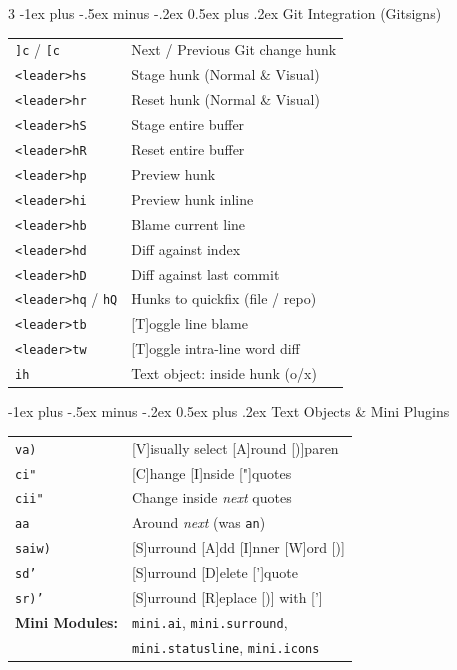 \documentclass[11pt,landscape]{article}
\makeatletter
\renewcommand{\section}{\@startsection{section}{1}{0mm}%
                                {-1ex plus -.5ex minus -.2ex}%
                                {0.5ex plus .2ex}%
                                {\normalfont\large\bfseries\color{myblue}}}
\makeatother
\begin{document}
\begin{multicols}{3}
\section{Git Integration (Gitsigns)}
\begin{tabular}{@{}ll@{}}
\texttt{]c} / \texttt{[c} & Next / Previous Git change hunk \\
\texttt{<leader>hs} & Stage hunk (Normal \& Visual) \\
\texttt{<leader>hr} & Reset hunk (Normal \& Visual) \\
\texttt{<leader>hS} & Stage entire buffer \\
\texttt{<leader>hR} & Reset entire buffer \\
\texttt{<leader>hp} & Preview hunk \\
\texttt{<leader>hi} & Preview hunk inline \\
\texttt{<leader>hb} & Blame current line \\
\texttt{<leader>hd} & Diff against index \\
\texttt{<leader>hD} & Diff against last commit \\
\texttt{<leader>hq} / \texttt{hQ} & Hunks to quickfix (file / repo) \\
\texttt{<leader>tb} & [T]oggle line blame \\
\texttt{<leader>tw} & [T]oggle intra-line word diff \\
\texttt{ih} & Text object: inside hunk (o/x) \\
\end{tabular}

\section{Text Objects \& Mini Plugins}
\begin{tabular}{@{}ll@{}}
\texttt{va)} & [V]isually select [A]round [)]paren \\
\texttt{ci"} & [C]hange [I]nside ["]quotes \\
\texttt{cii"} & Change inside \emph{next} quotes \\
\texttt{aa} & Around \emph{next} (was \texttt{an}) \\
\texttt{saiw)} & [S]urround [A]dd [I]nner [W]ord [)] \\
\texttt{sd'} & [S]urround [D]elete [']quote \\
\texttt{sr)'} & [S]urround [R]eplace [)] with ['] \\
\textbf{Mini Modules:} & \texttt{mini.ai}, \texttt{mini.surround}, \\
& \texttt{mini.statusline}, \texttt{mini.icons} \\
\end{tabular}


\end{multicols}
\end{document}
